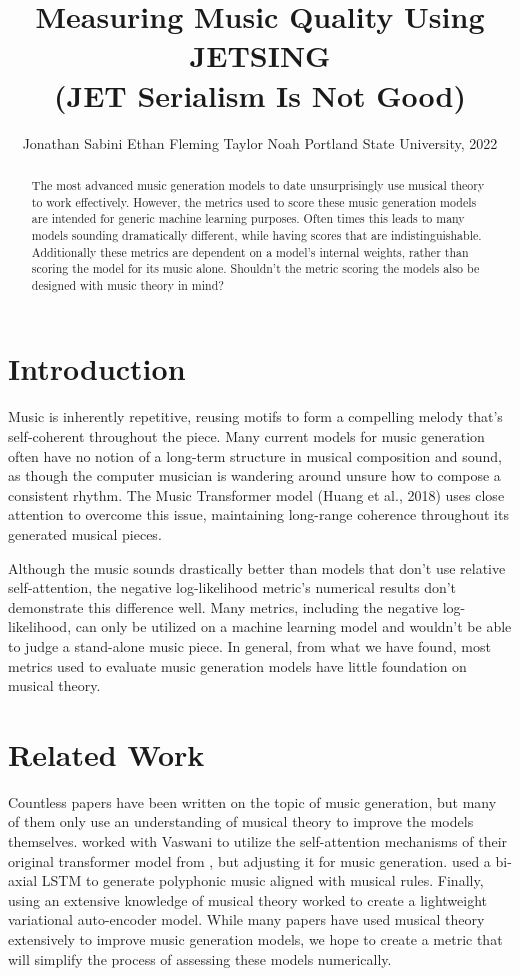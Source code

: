 \documentclass[11pt]{article}
\title{Measuring Music Quality Using JETSING \\ (JET Serialism Is Not Good) }
\author{Jonathan Sabini \And Ethan Fleming \And Taylor Noah 
\AND
Portland State University, 2022}
\begin{document}
\maketitle

\begin{abstract}
    The most advanced music generation models to date unsurprisingly use musical theory to work effectively.
    However, the metrics used to score these music generation models are intended for generic machine learning purposes.
    Often times this leads to many models sounding dramatically different, while having scores that are indistinguishable.
    Additionally these metrics are dependent on a model's internal weights, rather than scoring the model for its music alone.
    Shouldn't the metric scoring the models also be designed with music theory in mind?
\end{abstract}

\section{Introduction}
Music is inherently repetitive, reusing motifs to form a compelling melody that's self-coherent throughout the piece.
Many current models for music generation often have no notion of a long-term structure in musical composition and sound,
as though the computer musician is wandering around unsure how to compose a consistent rhythm.
The Music Transformer model (Huang et al., 2018) uses close attention to overcome this issue,
maintaining long-range coherence throughout its generated musical pieces.

Although the music sounds drastically better than models that don't use relative self-attention,
the negative log-likelihood metric's numerical results don't demonstrate this difference well.
Many metrics, including the negative log-likelihood, can only be utilized on a machine learning model and wouldn't be able to judge a stand-alone music piece.
In general, from what we have found, most metrics used to evaluate music generation models have little foundation on musical theory.

\section{Related Work}
Countless papers have been written on the topic of music generation, but many of them only use an understanding of musical theory to improve the models themselves.
\citep{huang2018music} worked with Vaswani to utilize the self-attention mechanisms of their original transformer model from \citep{vaswani2017attention}, but adjusting it for music generation.
\citep{kotecha2018generating} used a bi-axial LSTM to generate polyphonic music aligned with musical rules.
Finally, \citep{zhao2020verticalhorizontal} using an extensive knowledge of musical theory worked to create a lightweight variational auto-encoder model.
While many papers have used musical theory extensively to improve music generation models, we hope to create a metric that will simplify the process of assessing these models numerically.
\end{document}
